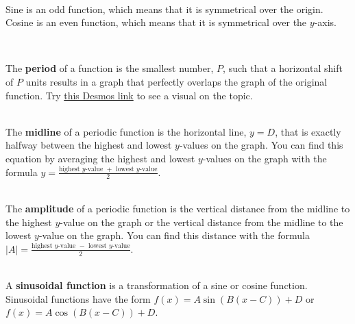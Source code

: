 \begin{myDefinition}~\\[0.5mm]
Sine is an odd function, which means that it is symmetrical over the origin. Cosine is an even function, which means that it is symmetrical over the $y$-axis. %
\end{myDefinition}

\begin{myDefinition}[{Period}]~\\[0.5mm]
	\begin{minipage}{0.9\textwidth}
		The \textbf{period} of a function is the smallest number, $P$, such that a horizontal shift of $P$ units results in a graph that perfectly overlaps the graph of the original function. Try \href{http://tiny.cc/period-definition}{this Desmos link} to see a visual on the topic. 
	\end{minipage}
	\begin{minipage}{0.1\textwidth}
		\hfill {}
	\end{minipage}
\end{myDefinition}

\begin{myDefinition}[{Midline}]~\\[0.5mm]
The \textbf{midline} of a periodic function is the horizontal line, $y=D$, that is exactly halfway between the highest and lowest $y$-values on the graph. You can find this equation by averaging the highest and lowest $y$-values on the graph with the formula $y=\frac{\text{highest $y$-value }+\text{ lowest $y$-value}}{2}$.
\end{myDefinition}

\begin{myDefinition}[{Amplitude}]~\\[0.5mm]
The \textbf{amplitude} of a periodic function is the vertical distance from the midline to the highest $y$-value on the graph or the vertical distance from the midline to the lowest $y$-value on the graph. You can find this distance with the formula $|A|=\frac{\text{highest $y$-value }-\text{ lowest $y$-value}}{2}$.
\end{myDefinition}

\begin{myDefinition}~\\[0.5mm]
A \textbf{sinusoidal function} is a transformation of a sine or cosine function. Sinusoidal functions have the form $f(x)=A\sin(B(x-C))+D$ or $f(x)=A\cos(B(x-C))+D$.
\end{myDefinition}

